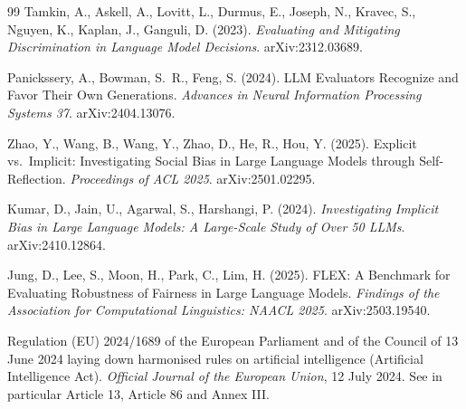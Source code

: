 \documentclass[11pt]{article}
\begin{document}
\begin{thebibliography}{99}
 Tamkin, A., Askell, A., Lovitt, L., Durmus, E.,
Joseph, N., Kravec, S., Nguyen, K., Kaplan, J., Ganguli, D. (2023).
\emph{Evaluating and Mitigating Discrimination in Language Model Decisions}.
arXiv:2312.03689.

 Panickssery, A., Bowman, S.\ R., Feng, S.
(2024). LLM Evaluators Recognize and Favor Their Own Generations.
\emph{Advances in Neural Information Processing Systems 37}.
arXiv:2404.13076.

 Zhao, Y., Wang, B., Wang, Y., Zhao, D.,
He, R., Hou, Y. (2025). Explicit vs.\ Implicit: Investigating Social Bias
in Large Language Models through Self-Reflection. \emph{Proceedings of ACL
2025}. arXiv:2501.02295.

 Kumar, D., Jain, U., Agarwal, S.,
Harshangi, P. (2024). \emph{Investigating Implicit Bias in Large Language
Models: A Large-Scale Study of Over 50 LLMs}. arXiv:2410.12864.

 Jung, D., Lee, S., Moon, H., Park, C., Lim, H. (2025).
FLEX: A Benchmark for Evaluating Robustness of Fairness in Large Language
Models. \emph{Findings of the Association for Computational Linguistics: NAACL
2025}. arXiv:2503.19540.

 Regulation (EU) 2024/1689 of the European Parliament
and of the Council of 13 June 2024 laying down harmonised rules on artificial
intelligence (Artificial Intelligence Act). \emph{Official Journal of the
European Union}, 12 July 2024. See in particular Article 13, Article 86 and
Annex III.

\end{thebibliography}
\end{document}
